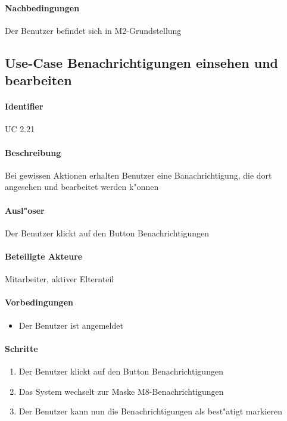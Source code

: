   \paragraph{Nachbedingungen}
  Der Benutzer befindet sich in M2-Grundstellung

  
  \newpage
 \subsection{Use-Case Benachrichtigungen einsehen und bearbeiten}
  \paragraph{Identifier}
  UC 2.21
  \paragraph{Beschreibung}
  Bei gewissen Aktionen erhalten Benutzer eine Banachrichtigung, die dort angesehen und bearbeitet werden k"onnen
  \paragraph{Ausl"oser}
  Der Benutzer klickt auf den Button \dq Benachrichtigungen\dq
  \paragraph{Beteiligte Akteure}   \leavevmode \newline
    Mitarbeiter, aktiver Elternteil
  \paragraph{Vorbedingungen}
  \begin{itemize}
   \item Der Benutzer ist angemeldet
  \end{itemize}

  \paragraph{Schritte}
  \begin{enumerate}
   \item Der Benutzer klickt auf den Button \dq Benachrichtigungen\dq
   \item Das System wechselt zur Maske M8-Benachrichtigungen
   \item Der Benutzer kann nun die Benachrichtigungen als best"atigt markieren
  \end{enumerate}

